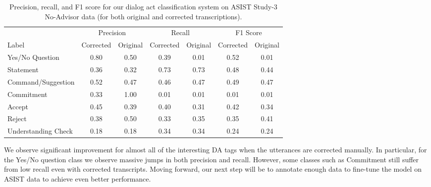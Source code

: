 \begin{table}
    \centering
    \begin{tabular}{l cc cc cc}
        \toprule
                            & \multicolumn{2}{c}{Precision} & \multicolumn{2}{c}{Recall} & \multicolumn{2}{c}{F1 Score}\\
                                \cmidrule(lr){2-3} \cmidrule(lr){4-5} \cmidrule(lr){6-7}
       Label                & Corrected & Original & Corrected & Original & Corrected & Original\\
                             \midrule
        Yes/No Question      & 0.80     & 0.50      & 0.39     & 0.01      & 0.52     & 0.01\\
        Statement            & 0.36     & 0.32      & 0.73     & 0.73      & 0.48     & 0.44\\
        Command/Suggestion   & 0.52     & 0.47      & 0.46     & 0.47      & 0.49     & 0.47\\
        Commitment           & 0.33     & 1.00      & 0.01     & 0.01      & 0.01     & 0.01\\
        Accept               & 0.45     & 0.39      & 0.40     & 0.31      & 0.42     & 0.34\\
        Reject               & 0.38     & 0.50      & 0.33     & 0.35      & 0.35     & 0.41\\
        Understanding Check  & 0.18     & 0.18      & 0.34     & 0.34      & 0.24     & 0.24\\
        \bottomrule
    \end{tabular}
    \caption{%
        Precision, recall, and F1 score for our dialog act classification
        system on ASIST Study-3 No-Advisor data (for both original and
        corrected transcriptions).
    }
    \label{tab:da_results}
\end{table}

We observe significant improvement for almost all of the interesting DA tags
when the utterances are corrected manually. In particular, for the Yes/No
question class we observe massive jumps in both precision and recall. However,
some classes such as Commitment still suffer from low recall even with
corrected transcripts. Moving forward, our next step will be to annotate enough
data to fine-tune the model on ASIST data to achieve even better performance.
